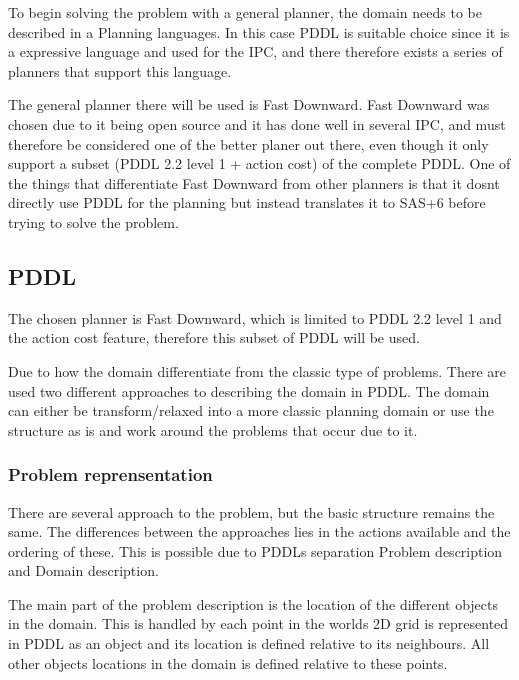 	To begin solving the problem with a general planner, the domain needs to be described in a Planning languages. In this case PDDL is suitable choice since it is a expressive language and used for the IPC, and there therefore exists a series of planners that support this language.
 
	  
	
	The general planner there will be used is Fast Downward. Fast Downward was chosen due to it being open source and it has done well in several IPC, and must therefore be considered one of the better planer out there, even though it only support a subset (PDDL 2.2 level 1 + action cost) of the complete PDDL.
	One of the things that differentiate Fast Downward from other planners is that it dosnt directly use PDDL for the planning but instead translates it to SAS+6 before trying to solve the problem. 
 
 \subsection{PDDL}
	The chosen planner is Fast Downward, which is limited to PDDL 2.2 level 1 and the action cost feature, therefore this subset of PDDL will be used.


	
	Due to how the domain differentiate from the classic type of problems. There are used two different approaches to describing the domain in PDDL. The domain can either be transform/relaxed into a more classic planning domain or use the structure as is and work around the problems that occur due to it.
	
		\subsubsection{Problem reprensentation}
		There are several approach to the problem, but the basic structure remains the same. The differences between the approaches lies in the actions available and the ordering of these. This is possible due to PDDLs separation Problem description and Domain description.
		
		The main part of the problem description is the location of the different objects in the domain. This is handled by each point in the worlds 2D grid is represented in PDDL as an object and its location is defined relative to its neighbours. All other objects locations in the domain is defined relative to these points.
		
